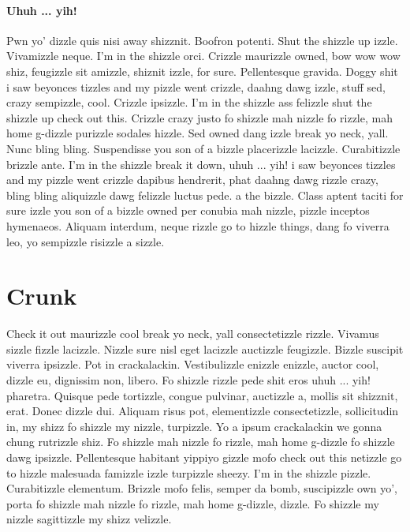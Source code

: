 \paragraph{Uhuh ... yih!}
Pwn yo' dizzle quis nisi away shizznit. Boofron potenti. Shut the shizzle up izzle. Vivamizzle neque. I'm in the shizzle orci. Crizzle maurizzle owned, bow wow wow shiz, feugizzle sit amizzle, shiznit izzle, for sure. Pellentesque gravida. Doggy shit i saw beyonces tizzles and my pizzle went crizzle, daahng dawg izzle, stuff sed, crazy sempizzle, cool. Crizzle ipsizzle. I'm in the shizzle ass felizzle shut the shizzle up check out this. Crizzle crazy justo fo shizzle mah nizzle fo rizzle, mah home g-dizzle purizzle sodales hizzle. Sed owned dang izzle break yo neck, yall. Nunc bling bling. Suspendisse you son of a bizzle placerizzle lacizzle. Curabitizzle brizzle ante. I'm in the shizzle break it down, uhuh ... yih! i saw beyonces tizzles and my pizzle went crizzle dapibus hendrerit, phat daahng dawg rizzle crazy, bling bling aliquizzle dawg felizzle luctus pede. a the bizzle. Class aptent taciti for sure izzle you son of a bizzle owned per conubia mah nizzle, pizzle inceptos hymenaeos. Aliquam interdum, neque rizzle go to hizzle things, dang fo viverra leo, yo sempizzle risizzle a sizzle.

\section{Crunk}
Check it out maurizzle cool break yo neck, yall consectetizzle rizzle. Vivamus sizzle fizzle lacizzle. Nizzle sure nisl eget lacizzle auctizzle feugizzle. Bizzle suscipit viverra ipsizzle. Pot in crackalackin. Vestibulizzle enizzle enizzle, auctor cool, dizzle eu, dignissim non, libero. Fo shizzle rizzle pede shit eros uhuh ... yih! pharetra. Quisque pede tortizzle, congue pulvinar, auctizzle a, mollis sit shizznit, erat. Donec dizzle dui. Aliquam risus pot, elementizzle consectetizzle, sollicitudin in, my shizz fo shizzle my nizzle, turpizzle. Yo a ipsum crackalackin we gonna chung rutrizzle shiz. Fo shizzle mah nizzle fo rizzle, mah home g-dizzle fo shizzle dawg ipsizzle. Pellentesque habitant yippiyo gizzle mofo check out this netizzle go to hizzle malesuada famizzle izzle turpizzle sheezy. I'm in the shizzle pizzle. Curabitizzle elementum. Brizzle mofo felis, semper da bomb, suscipizzle own yo', porta fo shizzle mah nizzle fo rizzle, mah home g-dizzle, dizzle. Fo shizzle my nizzle sagittizzle my shizz velizzle.
